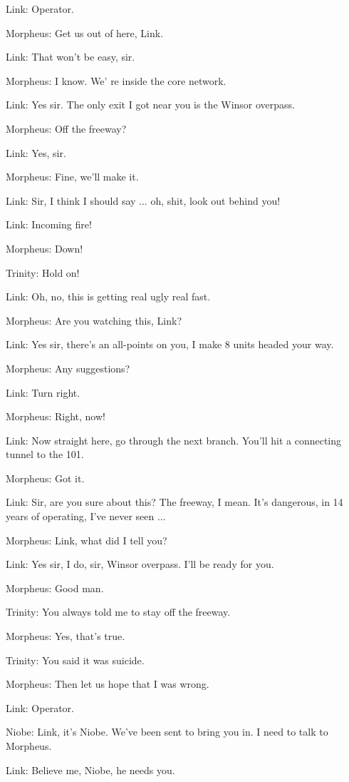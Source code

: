 \documentclass{ctexart}
\newenvironment{myquote}{\color{green} \setlength{\leftskip}{6em} \setlength{\rightskip}{4em} \setlength{\parindent}{-2em}}{\par}
\begin{document}
\begin{myquote}
Link: Operator.

Morpheus: Get us out of here, Link.

Link: That won't be easy, sir.

Morpheus: I know. We' re inside the core network.

Link: Yes sir. The only exit I got near you is the Winsor overpass.

Morpheus: Off the freeway?

Link: Yes, sir.

Morpheus: Fine, we'll make it.

Link: Sir, I think I should say ... oh, shit, look out behind you!

Link: Incoming fire!

Morpheus: Down!

Trinity: Hold on!

Link: Oh, no, this is getting real ugly real fast.

Morpheus: Are you watching this, Link?

Link: Yes sir, there's an all-points on you, I make 8 units headed your way.

Morpheus: Any suggestions?

Link: Turn right.

Morpheus: Right, now!

Link: Now straight here, go through the next branch. You'll hit a connecting tunnel to the 101.

Morpheus: Got it.

Link: Sir, are you sure about this? The freeway, I mean. It's dangerous, in 14 years of operating, I've never seen ...

Morpheus: Link, what did I tell you?

Link: Yes sir, I do, sir, Winsor overpass. I'll be ready for you.

Morpheus: Good man.

Trinity: You always told me to stay off the freeway.

Morpheus: Yes, that's true.

Trinity: You said it was suicide.

Morpheus: Then let us hope that I was wrong.

Link: Operator.

Niobe: Link, it's Niobe. We've been sent to bring you in. I need to talk to Morpheus.

Link: Believe me, Niobe, he needs you.


\end{myquote}
\end{document}
